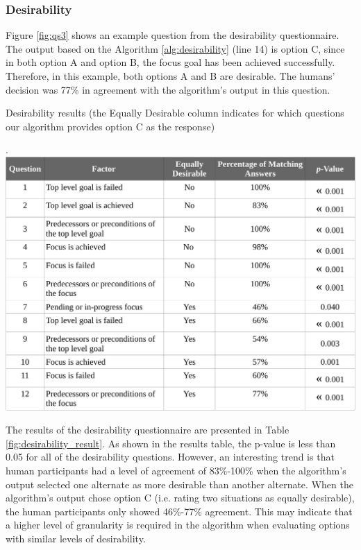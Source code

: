 \documentclass[12pt]{report}
\begin{document}
\subsubsection{Desirability}
\label{sec:desirability-crowdsourcing}
Figure \ref{fig:qs3} shows an example question from the desirability
questionnaire. The output based on the Algorithm \ref{alg:desirability}
(line 14) is option C, since in both option A and option B, the focus goal
has been achieved successfully. Therefore, in this example, both options A and B
are desirable. The humans' decision was 77\% in agreement with the algorithm's
output in this question.

\begin{table}[t]
  \centering
  \caption{Desirability results (the Equally Desirable column indicates
  for which questions our algorithm provides option C as the response)}.
  \label{fig:desirability_result}
  \vspace*{-3mm}
  \includegraphics[width=1\textwidth]{figure/desirability_result_croped.pdf}
\end{table}

The results of the desirability questionnaire are presented in Table
\ref{fig:desirability_result}. As shown in the results table, the p-value is
less than 0.05 for all of the desirability questions. However, an interesting
trend is that human participants had a level of agreement of 83\%-100\% when the
algorithm's output selected one alternate as more desirable than another
alternate. When the algorithm's output chose option C (i.e. rating two
situations as equally desirable), the human participants only showed 46\%-77\%
agreement. This may indicate that a higher level of granularity is required in
the algorithm when evaluating options with similar levels of desirability.
\end{document}
